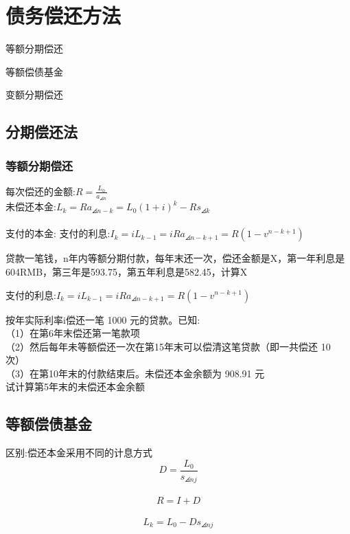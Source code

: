 \chapter{债务偿还方法}
\begin{introduction}
	\item 等额分期偿还
	\item 等额偿债基金
	\item 变额分期偿还
\end{introduction}
\section{分期偿还法}
\subsection{等额分期偿还}
\noinent 每次偿还的金额:$R=\frac{L_0}{a_{\angles{n}}}$\\
未偿还本金:$L_k=Ra_{\angles{n-k}}=L_0(1+i)^k-Rs_{\angles{k}}$\\
\\ 支付的本金:
支付的利息:$I_k=iL_{k-1}=iRa_{\angles{n-k+1}}=R(1-v^{n-k+1})$\\
\begin{exercise}
贷款一笔钱，n年内等额分期付款，每年末还一次，偿还金额是X，第一年利息是604RMB，第三年是593.75，第五年利息是582.45，计算X
\end{exercise}
\begin{note}
支付的利息:$I_k=iL_{k-1}=iRa_{\angles{n-k+1}}=R(1-v^{n-k+1})$
\end{note}
\begin{exercise}
按年实际利率i偿还一笔 1000 元的贷款。已知:\\
（1）在第6年末偿还第一笔款项\\
（2）然后每年未等额偿还一次在第15年末可以偿清这笔贷款（即一共偿还 10 次）\\
（3）在第10年末的付款结束后。未偿还本金余额为 908.91 元\\
试计算第5年末的未偿还本金余额
\end{exercise}
\section{等额偿债基金}
区别:偿还本金采用不同的计息方式\\
$$D=\frac{L_0}{s_{\angles{n}j}}$$\\
$$R=I+D$$\\
$$L_k=L_0-Ds_{\angles{n}j}$$